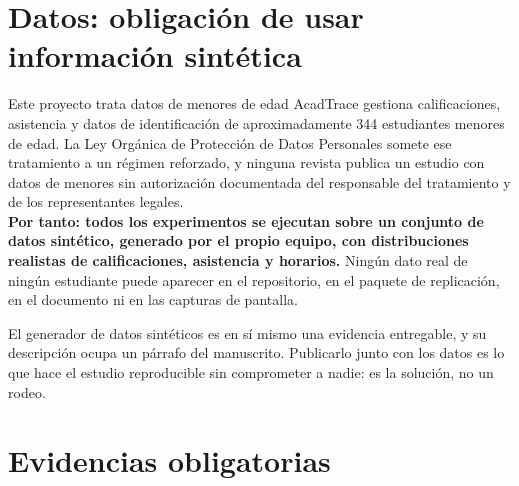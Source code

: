 \documentclass[11pt,a4paper]{article}
\begin{document}
\section{Datos: obligación de usar información sintética}

\begin{alerta}{Este proyecto trata datos de menores de edad}
	AcadTrace gestiona calificaciones, asistencia y datos de identificación de aproximadamente 344 estudiantes menores de edad. La Ley Orgánica de Protección de Datos Personales \cite{lopdp2021} somete ese tratamiento a un régimen reforzado, y ninguna revista publica un estudio con datos de menores sin autorización documentada del responsable del tratamiento y de los representantes legales.\\[6pt]
	\textbf{Por tanto: todos los experimentos se ejecutan sobre un conjunto de datos sintético, generado por el propio equipo, con distribuciones realistas de calificaciones, asistencia y horarios.} Ningún dato real de ningún estudiante puede aparecer en el repositorio, en el paquete de replicación, en el documento ni en las capturas de pantalla.
\end{alerta}

El generador de datos sintéticos es en sí mismo una evidencia entregable, y su descripción ocupa un párrafo del manuscrito. Publicarlo junto con los datos es lo que hace el estudio reproducible sin comprometer a nadie: es la solución, no un rodeo.

\section{Evidencias obligatorias}
\end{document}
